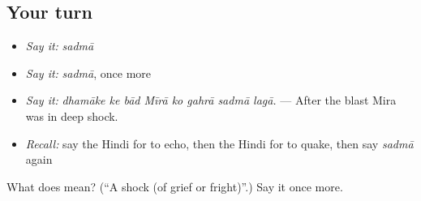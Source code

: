 \subsection*{Your turn}
\begin{itemize}
\raggedright
  \item \emph{Say it:} \emph{sadmā}
  \item \emph{Say it:} \emph{sadmā}, once more
  \item \emph{Say it:} \emph{dhamāke ke bād Mīrā ko gahrā sadmā lagā.} — After the blast Mira was in deep shock.
  \item \emph{Recall:} say the Hindi for to echo, then the Hindi for to quake, then say \emph{sadmā} again
\end{itemize}

\begin{tcolorbox}[breakable,colback=teal!4,colframe=teal!35!black,title={Before you move on}]
What does  mean? (\textquotedblleft{}A shock (of grief or fright)\textquotedblright{}.) Say it once more.
\end{tcolorbox}

